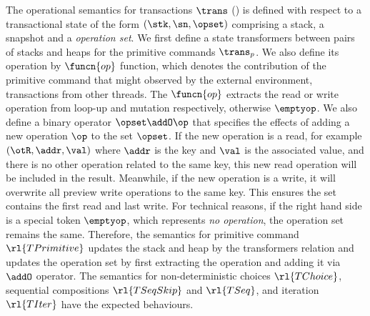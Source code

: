 The operational semantics for transactions \(\trans\) () is defined with respect to a transactional state of the form \((\stk, \sn, \opset)\) comprising a stack, a snapshot and a \emph{operation set}.
We first define a state transformers between pairs of stacks and heaps for the primitive commands \(\trans_{p}\).
We also define its operation by \( \funcn{op} \) function, which denotes the contribution of the primitive command that might observed by the external environment, \ie transactions from other threads.
The \( \funcn{op} \) extracts the read or write operation from loop-up and mutation respectively, otherwise \( \emptyop \).
We also define a binary operator \( \opset \addO \op \) that specifies the effects of adding a new operation \( \op \) to the set \( \opset \).
If the new operation is a read, for example \((\otR, \addr, \val)\) where \( \addr \) is the key and \( \val\) is the associated value, and there is no other operation related to the same key, this new read operation will be included in the result.
Meanwhile, if the new operation is a write, it will overwrite all preview write operations to the same key.
This ensures the set contains the first read and last write.
For technical reasons, if the right hand side is a special token \( \emptyop \), which represents \emph{no operation}, the operation set remains the same.
Therefore, the semantics for primitive command \(\rl{TPrimitive}\) updates the stack and heap by the transformers relation and updates the operation set by first extracting the operation and adding it via \( \addO \) operator.
The semantics for non-deterministic choices \(\rl{TChoice}\), sequential compositions \(\rl{TSeqSkip}\) and \(\rl{TSeq}\), and iteration \(\rl{TIter}\) have the expected behaviours.

